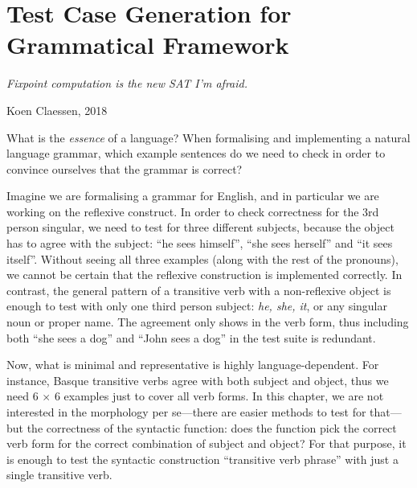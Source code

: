\def\numOfLex{17}
\def\numOfFun{8}
\def\gray#1{{\color{gray}\char`<#1\char`>}}
\newcommand{\tts}[1]{{\tt #1}}

\chapter{Test Case Generation for Grammatical Framework}
\label{chapterGFtest}

\epigraph{\it Fixpoint computation is the new SAT I'm afraid.}{Koen
  Claessen, 2018}

\noindent What is the \emph{essence} of a language? When formalising
and implementing a natural language grammar, which example sentences
do we need to check in order to convince ourselves that the grammar is
correct?

Imagine we are formalising a grammar for English, and in particular we
are working on the reflexive construct. In order to check correctness
for the 3rd person singular, we need to test for three different
subjects, because the object has to agree with the subject: ``he sees
himself'', ``she sees herself'' and ``it sees itself''. Without seeing
all three examples (along with the rest of the pronouns), we cannot be certain that the reflexive
construction is implemented correctly. In contrast, the general
pattern of a transitive verb with a non-reflexive object is enough to
test with only one third person subject: \emph{he, she, it}, or any
singular noun or proper name. The agreement only shows in the verb
form, thus including both ``she sees a dog'' and ``John sees a dog''
in the test suite is redundant.

Now, what is minimal and representative is highly language-dependent.
For instance, Basque transitive verbs agree with both subject and
object, thus we need 6 $\times$ 6 examples just to cover all verb
forms. In this chapter, we are not interested in the morphology per se---there are
easier methods to test for that---but the correctness of the syntactic
function: does the function pick the correct verb form for the correct
combination of subject and object? For that purpose, it is enough to
test the syntactic construction ``transitive verb phrase'' with just a
single transitive verb.


